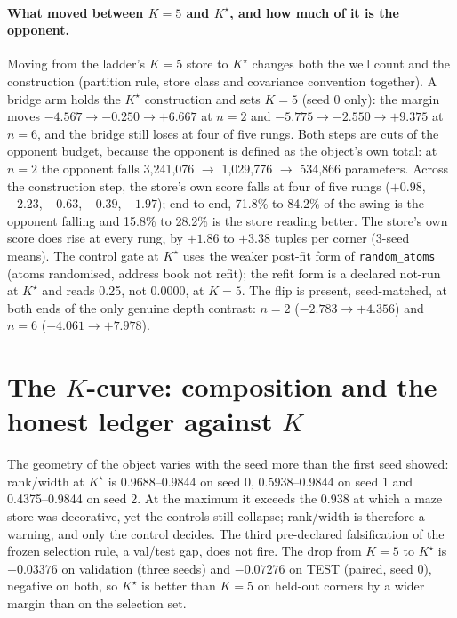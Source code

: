 \documentclass{article} %
\newcommand{\Kstar}{\ensuremath{K^{\star}}}
\begin{document}
\paragraph{What moved between $K=5$ and $\Kstar$, and how much of it is the opponent.} Moving
from the ladder's $K=5$ store to $\Kstar$ changes both the well count and the construction
(partition rule, store class and covariance convention together). A bridge arm holds the
$\Kstar$ construction and sets $K=5$ (seed 0 only): the margin moves $-4.567\to-0.250\to+6.667$
at $n=2$ and $-5.775\to-2.550\to+9.375$ at $n=6$, and the bridge still loses at four of five
rungs. %
Both steps are cuts of the opponent budget, because the opponent is defined as the object's own
total: at $n=2$ the opponent falls 3,241,076 $\to$ 1,029,776 $\to$ 534,866 parameters. Across the
construction step, the store's own score falls at four of five rungs ($+0.98$, $-2.23$, $-0.63$,
$-0.39$, $-1.97$); end to end, 71.8\% to 84.2\% of the swing is the opponent falling and 15.8\%
to 28.2\% is the store reading better. %
The store's own score does rise at every rung, by $+1.86$ to $+3.38$ tuples per corner (3-seed
means). %
The control gate at $\Kstar$ uses the weaker post-fit form of \texttt{random\_atoms} (atoms
randomised, address book not refit); the refit form is a declared not-run at $\Kstar$ and reads
0.25, not 0.0000, at $K=5$. %
The flip is present, seed-matched, at both ends of the only genuine depth contrast: $n=2$
($-2.783\to+4.356$) and $n=6$ ($-4.061\to+7.978$). %

\section{The $K$-curve: composition and the honest ledger against $K$}
\label{app:kcurve}

The geometry of the object varies with the seed more than the first seed showed:
rank/width at $\Kstar$ is 0.9688--0.9844 on seed 0, 0.5938--0.9844 on seed 1 and
0.4375--0.9844 on seed 2. At the maximum it exceeds the 0.938 at which a maze store was
decorative, yet the controls still collapse; rank/width is therefore a warning, and only the
control decides. %
The third pre-declared falsification of the frozen selection rule, a val/test gap, does not fire.
The drop from $K=5$ to $\Kstar$ is $-0.03376$ on validation (three seeds) and $-0.07276$ on
TEST (paired, seed 0), negative on both, so $\Kstar$ is better than $K=5$ on held-out corners
by a wider margin than on the selection set. %
\end{document}
